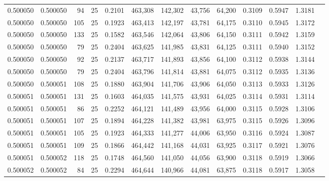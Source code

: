 \begin{tabular}{rrrrrrrrrrrrr}
0.500050 & 0.500050 &    94 &  25 &                                     0.2101 & 463,308 & 142,302 &  43,756 &  64,200 & 0.3109 & 0.5947 & 1.3181 \\
0.500050 & 0.500050 &   105 &  25 &                                     0.1923 & 463,413 & 142,197 &  43,781 &  64,175 & 0.3110 & 0.5945 & 1.3172 \\
0.500050 & 0.500050 &   133 &  25 &                                     0.1582 & 463,546 & 142,064 &  43,806 &  64,150 & 0.3111 & 0.5942 & 1.3159 \\
0.500050 & 0.500050 &    79 &  25 &                                     0.2404 & 463,625 & 141,985 &  43,831 &  64,125 & 0.3111 & 0.5940 & 1.3152 \\
0.500050 & 0.500050 &    92 &  25 &                                     0.2137 & 463,717 & 141,893 &  43,856 &  64,100 & 0.3112 & 0.5938 & 1.3144 \\
0.500050 & 0.500050 &    79 &  25 &                                     0.2404 & 463,796 & 141,814 &  43,881 &  64,075 & 0.3112 & 0.5935 & 1.3136 \\
0.500050 & 0.500051 &   108 &  25 &                                     0.1880 & 463,904 & 141,706 &  43,906 &  64,050 & 0.3113 & 0.5933 & 1.3126 \\
0.500051 & 0.500051 &   131 &  25 &                                     0.1603 & 464,035 & 141,575 &  43,931 &  64,025 & 0.3114 & 0.5931 & 1.3114 \\
0.500051 & 0.500051 &    86 &  25 &                                     0.2252 & 464,121 & 141,489 &  43,956 &  64,000 & 0.3115 & 0.5928 & 1.3106 \\
0.500051 & 0.500051 &   107 &  25 &                                     0.1894 & 464,228 & 141,382 &  43,981 &  63,975 & 0.3115 & 0.5926 & 1.3096 \\
0.500051 & 0.500051 &   105 &  25 &                                     0.1923 & 464,333 & 141,277 &  44,006 &  63,950 & 0.3116 & 0.5924 & 1.3087 \\
0.500051 & 0.500051 &   109 &  25 &                                     0.1866 & 464,442 & 141,168 &  44,031 &  63,925 & 0.3117 & 0.5921 & 1.3076 \\
0.500051 & 0.500052 &   118 &  25 &                                     0.1748 & 464,560 & 141,050 &  44,056 &  63,900 & 0.3118 & 0.5919 & 1.3066 \\
0.500052 & 0.500052 &    84 &  25 &                                     0.2294 & 464,644 & 140,966 &  44,081 &  63,875 & 0.3118 & 0.5917 & 1.3058 \\

\end{tabular}
